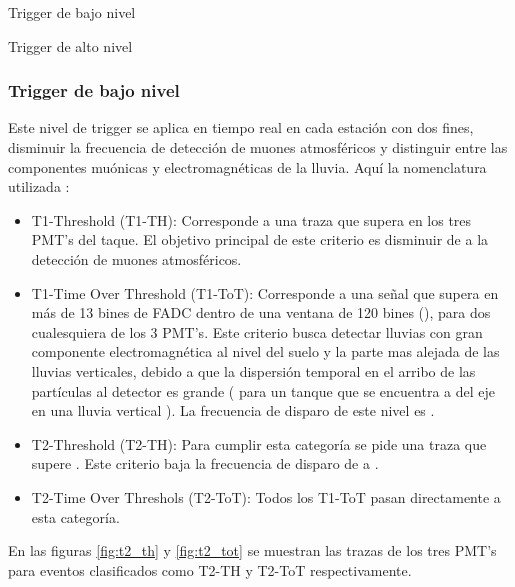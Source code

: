 		\begin{shortitemize}
		\item Trigger de bajo nivel
		\item Trigger de alto nivel
		\end{shortitemize}
		
			\subsubsection{Trigger de bajo nivel}
			
			Este nivel de trigger se aplica en tiempo real en cada estaci\'on con dos fines, disminuir la frecuencia de detecci\'on de muones atmosf\'ericos y distinguir entre las componentes mu\'onicas y electromagn\'eticas de la lluvia.
			Aqu\'i la nomenclatura utilizada \cite{nimtrig}:
			
			\begin{itemize}
			\item T1-Threshold (T1-TH): Corresponde a una traza que supera  en los tres PMT's del taque. El objetivo principal de este criterio es disminuir de  a  la detecci\'on de muones atmosf\'ericos.
			\item T1-Time Over Threshold (T1-ToT): Corresponde a una se\~nal que supera  en m\'as de 13 bines de FADC dentro de una ventana de 120 bines (), para dos cualesquiera de los 3 PMT's. Este criterio busca detectar lluvias con gran componente electromagn\'etica al nivel del suelo y la parte mas alejada de las lluvias verticales, debido a que la dispersi\'on temporal en el arribo de las part\'iculas al detector es grande ( para un tanque que se encuentra a  del eje en una lluvia vertical \cite{disp1,disp2}). La frecuencia de disparo de este nivel es .
			\item T2-Threshold (T2-TH): Para cumplir esta categor\'ia se pide una traza que supere . Este criterio baja la frecuencia de disparo de  a .
			\item T2-Time Over Threshols (T2-ToT): Todos los T1-ToT pasan directamente a esta categor\'ia. %
			\end{itemize}
			
			En las figuras \ref{fig:t2_th} y \ref{fig:t2_tot} se muestran las trazas de los tres PMT's para eventos clasificados como T2-TH y T2-ToT respectivamente.
			
